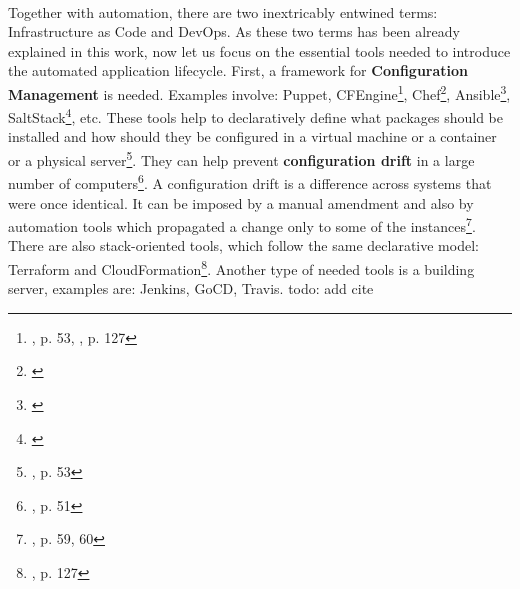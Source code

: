 \begin{itemize}
\paragraph{}
Together with automation, there are two inextricably entwined terms: Infrastructure as Code and DevOps. As these two terms has been already explained in this work, now let us focus on the essential tools needed to introduce the automated application lifecycle. First, a framework for \textbf{Configuration Management} is needed. Examples involve: Puppet, CFEngine\footnote{\cite{book-cicd}, p. 53, \cite{book-iac}, p. 127}, Chef\footnote{\cite{online-chef}}, Ansible\footnote{\cite{online-ansible}}, SaltStack\footnote{\cite{online-salt}}, etc. These tools help to declaratively define what packages should be installed and how should they be configured in a virtual machine or a container or a physical server\footnote{\cite{book-cicd}, p. 53}. They can help prevent \textbf{configuration drift} in a large number of computers\footnote{\cite{book-devops-k8s}, p. 51}. A configuration drift is a difference across systems that were once identical. It can be imposed by a manual amendment and also by automation tools which propagated a change only to some of the instances\footnote{\cite{book-iac}, p. 59, 60}. There are also stack-oriented tools, which follow the same declarative model: Terraform and CloudFormation\footnote{\cite{book-iac}, p. 127}. Another type of needed tools is a building server, examples are: Jenkins, GoCD, Travis. todo: add cite


\end{itemize}
